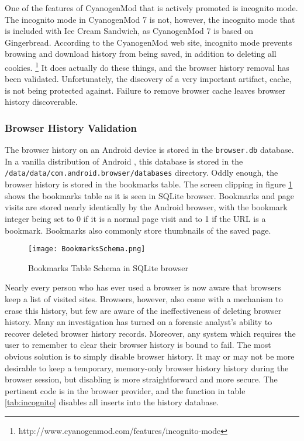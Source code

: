 One of the features of CyanogenMod that is actively promoted is incognito mode. The incognito mode in CyanogenMod 7 is not, however,
the incognito mode that is included with Ice Cream Sandwich, as CyanogenMod 7 is based on Gingerbread. According to the CyanogenMod
web site, incognito mode prevents browsing and download history from being saved, in addition to deleting all cookies.
\footnote{http://www.cyanogenmod.com/features/incognito-mode} It does actually do these things, and the browser history removal has
been validated.  Unfortunately, the discovery of a very important artifact, cache, is not being protected against. Failure to remove
browser cache leaves browser history discoverable.

\subsubsection{Browser History Validation}

The browser history on an Android device is stored in the \texttt{browser.db} database.  In a vanilla distribution of Android , this
database is stored in the \texttt{/data/data/com.android.browser/databases} directory.  Oddly enough, the browser history is stored
in the bookmarks table.  The screen clipping in figure \ref{fig:bookmarkschema} shows the bookmarks table as it is seen in SQLite
browser.  Bookmarks and page visits are stored nearly identically by the Android browser, with the bookmark integer being set to 0
if it is a normal page visit and to 1 if the URL is a bookmark.  Bookmarks also commonly store thumbnails of the saved page.
\begin{figure}[!htpb]
\texttt{[image: BookmarksSchema.png]}
\caption{Bookmarks Table Schema in SQLite browser}
\label{fig:bookmarkschema}
\end{figure}

Nearly every person who has ever used a browser is now aware that browsers keep a list of visited sites.  Browsers, however, also
come with a mechanism to erase this history, but few are aware of the ineffectiveness of deleting browser history.  Many an
investigation has turned on a forensic analyst's ability to recover deleted browser history records.  Moreover, any system which
requires the user to remember to clear their browser history is bound to fail.  The most obvious solution is to simply disable
browser history.  It may or may not be more desirable to keep a temporary, memory-only browser history history during the browser
session, but disabling is more straightforward and more secure.  The pertinent code is in the browser provider, and the function in
table \ref{tab:incognito} disables all inserts into the history database.


